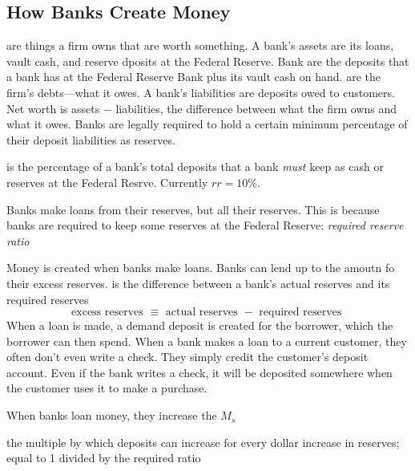 \documentclass{article}
\begin{document}
\subsection{How Banks Create Money}

 are things a firm owns that are worth something. A bank's assets are its loans, vault cash, and reserve dposits at the Federal Reserve. Bank  are the deposits that a bank has at the Federal Reserve Bank plus its vault cash on hand.  are the firm's debts---what it owes. A bank's liabilities are deposits owed to customers. Net worth is assets $-$ liabilities, the difference between what the firm owns and what it owes. Banks are legally required to hold a certain minimum percentage of their deposit liabilities as reserves. 

\begin{definition}
  is the percentage of a bank's total deposits that a bank \emph{must} keep as cash or reserves at the Federal Resrve. Currently $rr = 10\%$. 
\end{definition}

\begin{remark}
  Banks make loans from their reserves, but  all their reserves. This is because banks are required to keep some reserves at the Federal Reserve: \emph{required reserve ratio}
\end{remark}

Money is created when banks make loans. Banks can lend up to the amoutn fo their excess reserves.  is the difference between a bank's actual reserves and its required reserves $$\textrm{excess reserves } \equiv \textrm{ actual reserves } - \textrm{ required reserves }$$ When a loan is made, a demand deposit is created for the borrower, which the borrower can then spend. When a bank makes a loan to a current customer, they often don't even write a check. They simply credit the customer's deposit account. Even if the bank writes a check, it will be deposited somewhere when the customer uses it to make a purchase. \\ 

\begin{remark}
  When banks loan money, they increase the $M_{s}$
\end{remark}

\begin{definition}
  the multiple by which deposits can increase for every dollar increase in reserves; equal to 1 divided by the required ratio
\end{definition}
\end{document}
